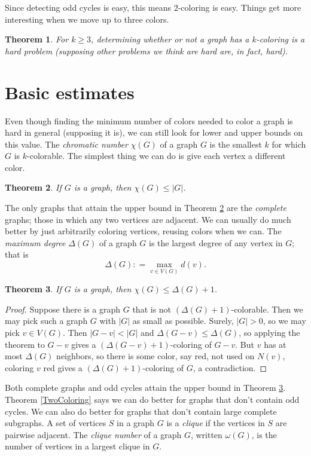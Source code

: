 \documentclass[openany]{tufte-book} %
\theoremstyle{plain}
\newtheorem{theorem}{Theorem}
\newcommand{\card}[1]{\left|#1\right|}
\newcommand{\parens}[1]{\left( #1 \right)}
\newcommand{\DefinedAs}{\mathrel{\mathop:}=}
\begin{document}
Since detecting odd cycles is easy, this means $2$-coloring is easy. Things get more interesting when we move up to three colors.
\begin{theorem}
For $k \ge 3$, determining whether or not a graph has a $k$-coloring is a hard problem (supposing other problems we think are hard are, in fact, hard).
\end{theorem}

\section{Basic estimates}
Even though finding the minimum number of colors needed to color a graph is hard in general (supposing it is), we can still
look for lower and upper bounds on this value.  The \emph{chromatic number} $\chi(G)$ of a graph $G$ is the smallest $k$ for which $G$ is $k$-colorable.
The simplest thing we can do is give each vertex a different color.
\begin{theorem}\label{WorstUpperBound}
If $G$ is a graph, then $\chi(G) \le \card{G}$.
\end{theorem}
The only graphs that attain the upper bound in Theorem \ref{WorstUpperBound} are the \emph{complete} graphs; those in which
any two vertices are adjacent.
We can usually do much better by just arbitrarily coloring vertices, reusing colors when we can. 
The \emph{maximum degree} $\Delta(G)$ of a graph $G$ is the largest degree
of any vertex in $G$; that is 
\[\Delta(G) \DefinedAs \max_{v \in V(G)} d(v).\]

\begin{theorem}\label{SecondWorstUpperBound}
If $G$ is a graph, then $\chi(G) \le \Delta(G) + 1$.
\end{theorem}
\begin{proof}
Suppose there is a graph $G$ that is not $\parens{\Delta(G) + 1}$-colorable.  Then we may pick such a graph $G$ with $\card{G}$ as small as possible.
Surely, $\card{G} > 0$, so we may pick $v \in V(G)$.  Then $\card{G-v} < \card{G}$ and $\Delta(G-v) \le \Delta(G)$, so applying the theorem to $G-v$ gives a $\parens{\Delta(G-v) + 1}$-coloring
of $G-v$.  But $v$ has at most $\Delta(G)$ neighbors, so there is some color, say red, not used on $N(v)$, coloring $v$ red gives a $\parens{\Delta(G) + 1}$-coloring
of $G$, a contradiction.
\end{proof}

Both complete graphs and odd cycles attain the upper bound in Theorem \ref{SecondWorstUpperBound}.  Theorem \ref{TwoColoring} says
we can do better for graphs that don't contain odd cycles.  We can also do better for graphs that don't contain large complete subgraphs.
A set of vertices $S$ in a graph $G$ is a \emph{clique} if the vertices in $S$ are pairwise adjacent.
The \emph{clique number} of a graph $G$, written $\omega(G)$, is the number of vertices in a largest clique in $G$.
\end{document}
